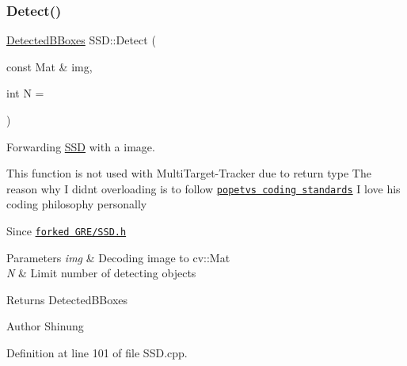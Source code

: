 \subsubsection{\texorpdfstring{Detect()}{Detect()}}
{\footnotesize\ttfamily \mbox{\hyperlink{_s_s_d_8h_a6145f2543054bcfbafc56318060f727b}{Detected\+B\+Boxes}} S\+S\+D\+::\+Detect (\begin{DoxyParamCaption}\item[{const Mat \&}]{img,  }\item[{int}]{N = {} }\end{DoxyParamCaption})\hspace{0.3cm}{\ttfamily [virtual]}}



Forwarding \mbox{\hyperlink{class_s_s_d}{S\+SD}} with a image. 

This function is not used with Multi\+Target-\/\+Tracker due to return type The reason why I didn\textquotesingle{}t overloading is to follow \href{https://docs.google.com/document/d/1cT8EPgMXe0eopeHvwuFmbHG4TJr5kUmcovkr5irQZmo/edit#heading=h.r5zmbif4dbnf}{\tt popetv\textquotesingle{}s coding standards} I love his coding philosophy personally

\begin{DoxySince}{Since}
\href{https://github.com/Shinung/gpu-rest-engine/blob/ssd_gre/caffe_ssd/SSD.h}{\tt forked G\+R\+E/\+S\+S\+D.\+h} 
\end{DoxySince}

\begin{DoxyParams}{Parameters}
{\em img} & Decoding image to cv\+::\+Mat \\
\hline
{\em N} & Limit number of detecting objects \\
\hline
\end{DoxyParams}
\begin{DoxyReturn}{Returns}
Detected\+B\+Boxes 
\end{DoxyReturn}
\begin{DoxyAuthor}{Author}
Shinung 
\end{DoxyAuthor}


Definition at line 101 of file S\+S\+D.\+cpp.


